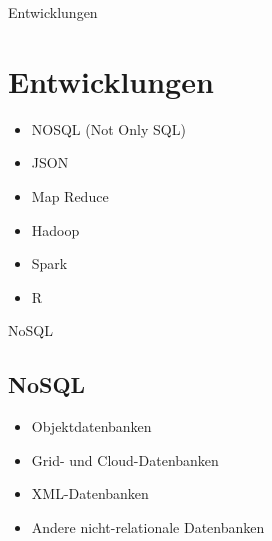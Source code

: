 \documentclass[11pt]{beamer}
\begin{document}
\begin{frame}{Entwicklungen}
\section{Entwicklungen}
	\begin{itemize}
	\item NOSQL (Not Only SQL)
	\item JSON 
	\item Map Reduce
	\item Hadoop
	\item Spark
	\item R
	\end{itemize}
\end{frame}



%

\begin{frame}{NoSQL}
\subsection{NoSQL}
\begin{itemize}
\item Objektdatenbanken
\item Grid- und Cloud-Datenbanken
\item XML-Datenbanken
\item Andere nicht-relationale Datenbanken
\end{itemize}
\end{frame}
\end{document}

